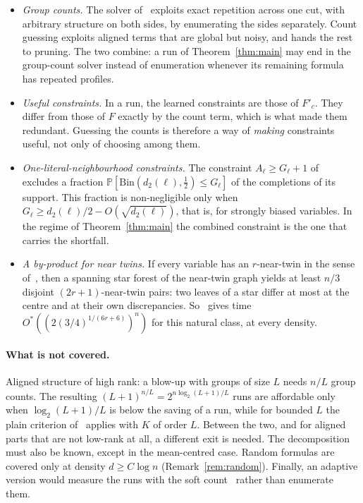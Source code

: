 \documentclass[11pt,a4paper]{article}
\theoremstyle{definition}
\theoremstyle{remark}
\newcommand{\Ostar}{O^{*}}
\newcommand{\Prb}{\mathbb P}
\begin{document}
\begin{itemize}
 \item \emph{Group counts.} The solver of~\cite[Section~5]{RG} exploits exact
 repetition across one cut, with arbitrary structure on both sides, by
 enumerating the sides separately. Count guessing exploits aligned terms that
 are global but noisy, and hands the rest to pruning. The two combine: a
 run of Theorem~\ref{thm:main} may end in the group-count solver instead of
 enumeration whenever its remaining formula has repeated profiles.
 \item \emph{Useful constraints.} In a run, the learned constraints are those
 of $F'_c$. They differ from those of $F$ exactly by the count term, which is
 what made them redundant. Guessing the counts is therefore a way of
 \emph{making} constraints useful, not only of choosing among them.
 \item \emph{One-literal-neighbourhood constraints.} The constraint
 $A_\ell\ge G_\ell+1$ of~\cite[Section~2]{RG} excludes a fraction
 $\Prb[\mathrm{Bin}(d_2(\ell),\frac12)\le G_\ell]$ of the completions of its
 support. This fraction is non-negligible only when $G_\ell\ge
 d_2(\ell)/2-O(\sqrt{d_2(\ell)})$, that is, for strongly biased variables. In
 the regime of Theorem~\ref{thm:main} the combined constraint is the one that
 carries the shortfall.
 \item \emph{A by-product for near twins.} If every variable has an
 $r$-near-twin in the sense of~\cite{NT}, then a spanning star forest of the
 near-twin graph yields at least $n/3$ disjoint $(2r+1)$-near-twin pairs:
 two leaves of a star differ at most at the centre and at their own
 discrepancies. So~\cite[Theorem~3]{NT} gives time
 $\Ostar((2(3/4)^{1/(6r+6)})^n)$ for this natural class, at every density.
\end{itemize}

\paragraph{What is not covered.} Aligned structure of high rank: a blow-up
with groups of size $L$ needs $n/L$ group counts. The resulting
$(L+1)^{n/L}=2^{n\log_2(L+1)/L}$ runs are affordable only when
$\log_2(L+1)/L$ is below the saving of a run, while for bounded $L$ the plain
criterion of~\cite{CC} applies with $K$ of order $L$. Between the two, and for aligned parts that are not
low-rank at all, a different exit is needed. The decomposition must also be
known, except in the mean-centred case. Random formulas are covered only at
density $d\ge C\log n$ (Remark~\ref{rem:random}). Finally, an adaptive version would
measure the runs with the soft count~\cite{SC} rather than
enumerate them.
\end{document}
